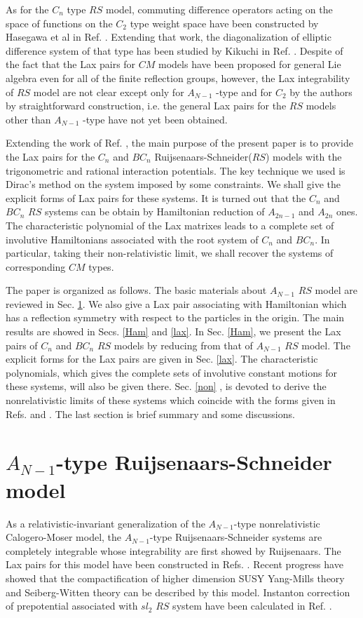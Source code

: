 \documentclass[a4paper,12pt]{article}
\newcommand{\sect}[1]{\setcounter{equation}{0}\section{#1}}
\begin{document}
As for the $C_{n}$ type $RS$ model, commuting difference operators acting on
the space of functions on the $C_{2}$ type weight space have been
constructed by Hasegawa et al in Ref. \cite{h2}. Extending that work, the
diagonalization of elliptic difference system of that type has been studied
by Kikuchi in Ref. \cite{ki}. Despite of the fact that the Lax pairs for $CM$
models have been proposed for general Lie algebra even for all of the finite
reflection groups\cite{bcs1}, however, the Lax integrability of $RS$ model are
not clear except only for $A_{N-1}$ -type\cite{r1, nksr, bc, kz, s1, s2} and
for $C_{2}$ by the authors by straightforward construction\cite{kai3}, i.e.
the general Lax pairs for the $RS$ models other than $A_{N-1}$ -type have not
yet been obtained.

Extending the work of Ref. \cite{kai3}, the main purpose of the present paper is
to provide the Lax pairs for the $C_{n}$ and $BC_{n}$
Ruijsenaars-Schneider($RS$) models with the trigonometric and rational
interaction potentials. The key technique we used is Dirac's method
on the system imposed by some constraints. We shall give the explicit forms of
Lax pairs for these systems. It is turned out that the $C_{n}$ and $BC_{n}$
$RS$ systems can be obtain by Hamiltonian reduction of $A_{2n-1}$ and $A_{2n}$
ones. The characteristic polynomial of the Lax matrixes leads to a complete
set of involutive Hamiltonians associated with the root system of $C_{n}$
and $BC_{n}$. In particular, taking their non-relativistic limit, we shall
recover the systems of corresponding $CM$ types.

The paper is organized as follows. The basic materials about $A_{N-1}$ $RS$
model are reviewed in Sec. \ref{ars}. We also give a Lax pair associating
with Hamiltonian which has a reflection symmetry with respect to the
particles in the origin. The main results are showed in Secs. \ref{Ham} and
 \ref{lax}. In Sec. \ref{Ham}, we present the Lax pairs of $C_{n}$ and
$BC_{n}$ $RS$ models by reducing from that of $A_{N-1}$ $RS$ model. The
explicit forms for the Lax pairs are given in Sec. \ref{lax}. The
characteristic polynomials, which gives the complete sets of involutive
constant motions for these systems, will also be given there. Sec. \ref{non}%
, is devoted to derive the nonrelativistic limits of these systems which
coincide with the forms given in Refs. \cite{op} and \cite{bcs}. The last
section is brief summary and some discussions.

\sect{$A_{N-1}$-type Ruijsenaars-Schneider model}
\label{ars} \vspace{1pt}
As a relativistic-invariant generalization of the $A_{N-1}$-type
nonrelativistic Calogero-Moser model, the $A_{N-1}$-type
Ruijsenaars-Schneider systems are completely integrable whose integrability
are first showed by Ruijsenaars\cite{r1,r2}. The Lax pairs for this model
have been constructed in Refs. \cite{r1, nksr, bc, kz, s1, s2}. Recent progress
have showed that the compactification of higher dimension SUSY Yang-Mills
theory and Seiberg-Witten theory can be described by this model\cite{bmmm}.
Instanton correction of prepotential associated with $sl_{2}$ $RS$ system have
been calculated in Ref. \cite{ohta}.
\end{document}
